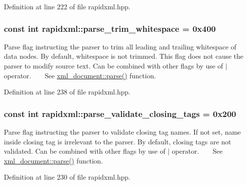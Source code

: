 Definition at line 222 of file rapidxml.\+hpp.

\subsubsection[{\texorpdfstring{parse\+\_\+trim\+\_\+whitespace}{parse_trim_whitespace}}]{\setlength{\rightskip}{0pt plus 5cm}const int rapidxml\+::parse\+\_\+trim\+\_\+whitespace = 0x400}\hypertarget{namespacerapidxml_a61912424b47db5038e726d4e1c22417f}{}\label{namespacerapidxml_a61912424b47db5038e726d4e1c22417f}
Parse flag instructing the parser to trim all leading and trailing whitespace of data nodes. By default, whitespace is not trimmed. This flag does not cause the parser to modify source text. Can be combined with other flags by use of $\vert$ operator. ~\newline
~\newline
 See \hyperlink{classrapidxml_1_1xml__document_ac6e73ff9ac323bf5a370c38feb03a6b1}{xml\+\_\+document\+::parse()} function. 

Definition at line 238 of file rapidxml.\+hpp.

\subsubsection[{\texorpdfstring{parse\+\_\+validate\+\_\+closing\+\_\+tags}{parse_validate_closing_tags}}]{\setlength{\rightskip}{0pt plus 5cm}const int rapidxml\+::parse\+\_\+validate\+\_\+closing\+\_\+tags = 0x200}\hypertarget{namespacerapidxml_a7ce8f40fda68338e20b56f41e48e49f3}{}\label{namespacerapidxml_a7ce8f40fda68338e20b56f41e48e49f3}
Parse flag instructing the parser to validate closing tag names. If not set, name inside closing tag is irrelevant to the parser. By default, closing tags are not validated. Can be combined with other flags by use of $\vert$ operator. ~\newline
~\newline
 See \hyperlink{classrapidxml_1_1xml__document_ac6e73ff9ac323bf5a370c38feb03a6b1}{xml\+\_\+document\+::parse()} function. 

Definition at line 230 of file rapidxml.\+hpp.

